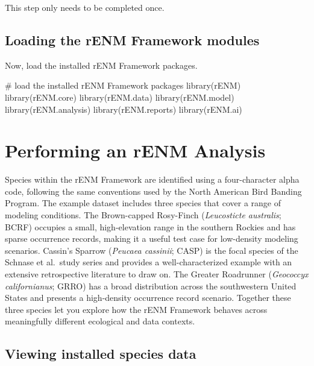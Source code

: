 \documentclass[
  letterpaper,
  DIV=11,
  numbers=noendperiod]{scrartcl}
\newenvironment{Shaded}{\begin{snugshade}}{\end{snugshade}}
\newcommand{\CommentTok}[1]{\textcolor[rgb]{0.37,0.37,0.37}{#1}}
\newcommand{\FunctionTok}[1]{\textcolor[rgb]{0.28,0.35,0.67}{#1}}
\newcommand{\NormalTok}[1]{\textcolor[rgb]{0.00,0.23,0.31}{#1}}
\begin{document}
This step only needs to be completed once.

\subsection{Loading the rENM Framework
modules}\label{loading-the-renm-framework-modules}

Now, load the installed rENM Framework packages.

\begin{Shaded}
\begin{Highlighting}[]
\CommentTok{\# load the installed rENM Framework packages}
\FunctionTok{library}\NormalTok{(rENM)}
\FunctionTok{library}\NormalTok{(rENM.core)}
\FunctionTok{library}\NormalTok{(rENM.data)}
\FunctionTok{library}\NormalTok{(rENM.model)}
\FunctionTok{library}\NormalTok{(rENM.analysis)}
\FunctionTok{library}\NormalTok{(rENM.reports)}
\FunctionTok{library}\NormalTok{(rENM.ai)}
\end{Highlighting}
\end{Shaded}

\section{Performing an rENM Analysis}\label{performing-an-renm-analysis}

Species within the rENM Framework are identified using a four-character
alpha code, following the same conventions used by the North American
Bird Banding Program. The example dataset includes three species that
cover a range of modeling conditions. The Brown-capped Rosy-Finch
(\emph{Leucosticte australis}; BCRF) occupies a small, high-elevation
range in the southern Rockies and has sparse occurrence records, making
it a useful test case for low-density modeling scenarios. Cassin's
Sparrow (\emph{Peucaea cassinii}; CASP) is the focal species of the
Schnase et al.~study series and provides a well-characterized example
with an extensive retrospective literature to draw on. The Greater
Roadrunner (\emph{Geococcyx californianus}; GRRO) has a broad
distribution across the southwestern United States and presents a
high-density occurrence record scenario. Together these three species
let you explore how the rENM Framework behaves across meaningfully
different ecological and data contexts.

\subsection{Viewing installed species
data}\label{viewing-installed-species-data}
\end{document}
